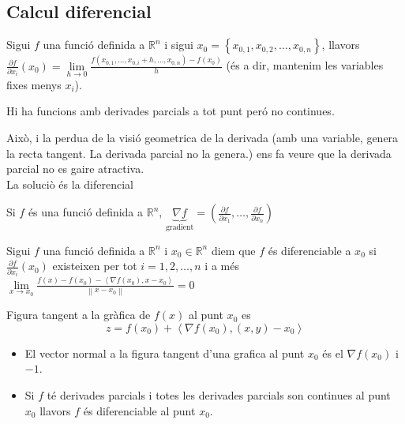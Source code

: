 \documentclass[../main.tex]{subfiles}
\begin{document}
    \subsection{Calcul diferencial}
    \begin{definicio}
        Sigui $f$ una funció definida a $\mathbb{R}^n$ i sigui $x_0=\left\{x_{0,1}, x_{0,2}, \dots, x_{0,n}\right\}$, 
        llavors $\frac{\partial f}{\partial x_i}\left(x_0\right) = \lim\limits_{h\rightarrow0} \frac{f\left(x_{0,1}, \dots, x_{0,i}+h, \dots, x_{0,n}\right)-f(x_0)}{h}$
        (és a dir, mantenim les variables fixes menys $x_i$).
    \end{definicio}
    \begin{obs}
        Hi ha funcions amb derivades parcials a tot punt peró no continues.
    \end{obs}
    Això, i la perdua de la visió geometrica de la derivada (amb una variable, genera la recta
    tangent. La derivada parcial no la genera.) ens fa veure que la derivada parcial no es gaire
    atractiva.\\
    La soluciò és la diferencial
    \begin{notacio}
        Si $f$ és una funció definida a $\mathbb{R}^n$, $\underbrace{\nabla f}_\text{gradient} = \left(\frac{\partial f}{\partial x_1}, \dots, \frac{\partial f}{\partial x_n} \right)$
    \end{notacio}
    \begin{definicio}
        Sigui $f$ una funció definida a $\mathbb{R}^n$ i $x_0 \in \mathbb{R}^n$ diem que $f$ és
        diferenciable a $x_0$ si $\frac{\partial f}{\partial x_i}(x_0)$ existeixen per tot $i = 1, 2, \dots, n$
        i a més $\lim\limits_{x \to x_0} \frac{f\left(x\right) - f\left(x_0\right)-\left\langle \nabla f\left(x_0\right), x-x_0\right\rangle }{\left\lVert x-x_0\right\rVert } = 0$
    \end{definicio}
    \begin{proposicio}
        Figura tangent a la gràfica de $f\left(x\right)$ al punt $x_0$ es
        \begin{displaymath}
            z = f\left(x_0\right) + \left\langle \nabla f \left(x_0\right), \left(x,y\right)-x_0\right\rangle 
        \end{displaymath} 
    \end{proposicio}
    \begin{obs}
        \begin{itemize}
            \item El vector normal a la figura tangent d'una grafica al punt $x_0$ és el $\nabla f\left(x_0\right)$ i $-1$.
            \item Si $f$ té derivades parcials i totes les derivades parcials son continues al punt $x_0$
            llavors $f$ és diferenciable al punt $x_0$.
        \end{itemize}
    \end{obs}
\end{document}
